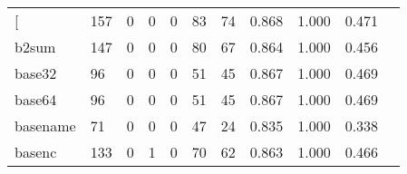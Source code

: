 \begin{longtable}{lp{1.2cm}p{1.2cm}p{1.2cm}p{1.2cm}p{1.2cm}p{1.2cm}p{1.2cm}p{1.2cm}p{1.2cm}p{1.2cm}}
\bottomrule
\endlastfoot
{[}         &                                   157 &                                                  0 &                                                  0 &                                                  0 &                                                 83 &                                                 74 &                                         0.868 &                                              1.000 &                                              0.471 \\
b2sum     &                                   147 &                                                  0 &                                                  0 &                                                  0 &                                                 80 &                                                 67 &                                         0.864 &                                              1.000 &                                              0.456 \\
base32    &                                    96 &                                                  0 &                                                  0 &                                                  0 &                                                 51 &                                                 45 &                                         0.867 &                                              1.000 &                                              0.469 \\
base64    &                                    96 &                                                  0 &                                                  0 &                                                  0 &                                                 51 &                                                 45 &                                         0.867 &                                              1.000 &                                              0.469 \\
basename  &                                    71 &                                                  0 &                                                  0 &                                                  0 &                                                 47 &                                                 24 &                                         0.835 &                                              1.000 &                                              0.338 \\
basenc    &                                   133 &                                                  0 &                                                  1 &                                                  0 &                                                 70 &                                                 62 &                                         0.863 &                                              1.000 &                                              0.466 \\

\end{longtable}

